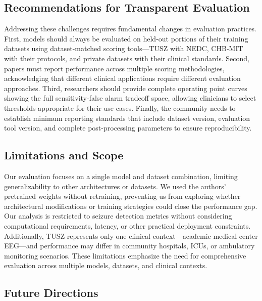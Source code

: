 \hypertarget{recommendations-for-transparent-evaluation}{%
\subsection{Recommendations for Transparent
Evaluation}\label{recommendations-for-transparent-evaluation}}

Addressing these challenges requires fundamental changes in evaluation
practices. First, models should always be evaluated on held-out portions
of their training datasets using dataset-matched scoring tools---TUSZ
with NEDC, CHB-MIT with their protocols, and private datasets with their
clinical standards. Second, papers must report performance across
multiple scoring methodologies, acknowledging that different clinical
applications require different evaluation approaches. Third, researchers
should provide complete operating point curves showing the full
sensitivity-false alarm tradeoff space, allowing clinicians to select
thresholds appropriate for their use cases. Finally, the community needs
to establish minimum reporting standards that include dataset version,
evaluation tool version, and complete post-processing parameters to
ensure reproducibility.

\hypertarget{limitations-and-scope}{%
\subsection{Limitations and Scope}\label{limitations-and-scope}}

Our evaluation focuses on a single model and dataset combination,
limiting generalizability to other architectures or datasets. We used
the authors' pretrained weights without retraining, preventing us from
exploring whether architectural modifications or training strategies
could close the performance gap. Our analysis is restricted to seizure
detection metrics without considering computational requirements,
latency, or other practical deployment constraints. Additionally, TUSZ
represents only one clinical context---academic medical center EEG---and
performance may differ in community hospitals, ICUs, or ambulatory
monitoring scenarios. These limitations emphasize the need for
comprehensive evaluation across multiple models, datasets, and clinical
contexts.

\hypertarget{future-directions}{%
\subsection{Future Directions}\label{future-directions}}

